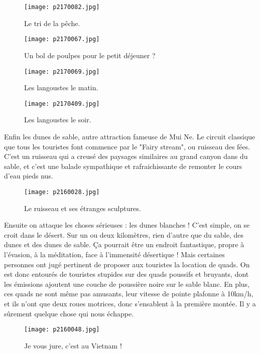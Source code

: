 \documentclass{book}
\begin{document}
\begin{figure}[h]
\centering
\texttt{[image: p2170082.jpg]}
\caption*{Le tri de la pêche.}
\end{figure}


\begin{figure}[h]
\centering
\texttt{[image: p2170067.jpg]}
\caption*{Un bol de poulpes pour le petit déjeuner ?}
\end{figure}


\begin{figure}[h]
\centering
\texttt{[image: p2170069.jpg]}
\caption*{Les langoustes le matin.}
\end{figure}


\begin{figure}[h]
\centering
\texttt{[image: p2170409.jpg]}
\caption*{Les langoustes le soir.}
\end{figure}

Enfin les dunes de sable, autre attraction fameuse de Mui Ne. Le circuit classique que tous les touristes font commence par le "Fairy stream", ou ruisseau des fées. C'est un ruisseau qui a creusé des paysages similaires au grand canyon dans du sable, et c'est une balade sympathique et rafraichissante de remonter le cours d'eau pieds nus.


\begin{figure}[h]
\centering
\texttt{[image: p2160028.jpg]}
\caption*{Le ruisseau et ses étranges sculptures.}
\end{figure}

Ensuite on attaque les choses sérieuses : les dunes blanches ! C'est simple, on se croit dans le désert. Sur un ou deux kilomètres, rien d'autre que du sable, des dunes et des dunes de sable. Ça pourrait être un endroit fantastique, propre à l'évasion, à la méditation, face à l'immensité désertique ! Mais certaines personnes ont jugé pertinent de proposer aux touristes la location de quads. On est donc entourés de touristes stupides sur des quads poussifs et bruyants, dont les émissions ajoutent une couche de poussière noire sur le sable blanc. En plus, ces quads ne sont même pas amusants, leur vitesse de pointe plafonne à 10km/h, et ils n'ont que deux roues motrices, donc s'ensablent à la première montée. Il y a sûrement quelque chose qui nous échappe.


\begin{figure}[h]
\centering
\texttt{[image: p2160048.jpg]}
\caption*{Je vous jure, c'est au Vietnam !}
\end{figure}
\end{document}
